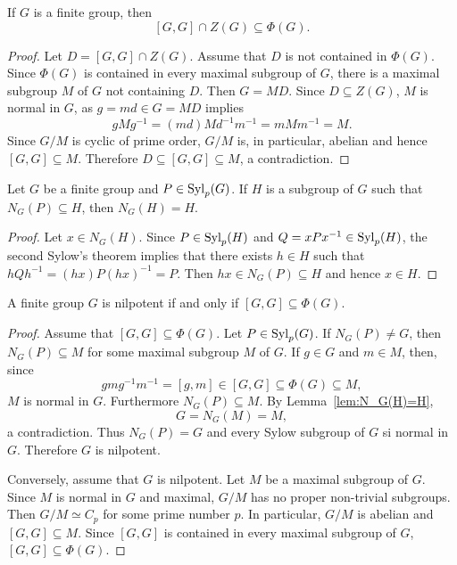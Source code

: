 \begin{theorem}
	\label{thm:Gaschutz}
	If $G$ is a finite group, then 
	\[
	[G,G]\cap Z(G)\subseteq\Phi(G).
	\]
\end{theorem}

\begin{proof}
Let $D=[G,G]\cap Z(G)$. Assume that $D$ is not contained in $\Phi(G)$.
Since $\Phi(G)$ is contained in every maximal subgroup of $G$, 
there is a maximal subgroup $M$ of $G$ not containing $D$. Then
$G=MD$. Since $D\subseteq Z(G)$, $M$ is normal in $G$, as 
	$g=md\in G=MD$ implies 
	\[
		gMg^{-1}=(md)Md^{-1}m^{-1}=mMm^{-1}=M.
	\]
	Since $G/M$ is cyclic of prime order, 
	$G/M$ is, in particular, abelian and hence $[G,G]\subseteq M$. Therefore 
	$D\subseteq [G,G]\subseteq M$, a contradiction.
\end{proof}

\begin{lemma}
\label{lem:N_G(H)=H}
Let $G$ be a finite group and $P\in\mathrm{Syl}_p(G)$. If $H$ is a subgroup of $G$ such that
$N_G(P)\subseteq H$, then $N_G(H)=H$.
\end{lemma}

\begin{proof}
Let $x\in N_G(H)$. Since $P\in\mathrm{Syl}_p(H)$ and $Q=xPx^{-1}\in\mathrm{Syl}_p(H)$, the second Sylow's theorem 
implies that there exists 
$h\in H$ such that $hQh^{-1}=(hx)P(hx)^{-1}=P$. Then $hx\in
N_G(P)\subseteq H$ and hence $x\in H$. 
\end{proof}

\begin{theorem}[Wielandt]
\label{thm:Wielandt}
A finite group $G$ is nilpotent if and only if 
$[G,G]\subseteq\Phi(G)$.
\end{theorem}

\begin{proof}
Assume that $[G,G]\subseteq\Phi(G)$. Let $P\in\mathrm{Syl}_p(G)$. If $N_G(P)\ne
G$, then $N_G(P)\subseteq M$ for some maximal subgroup $M$ of $G$. If 
$g\in G$ and $m\in M$, then, since 
\[
	gmg^{-1}m^{-1}=[g,m]\in [G,G]\subseteq\Phi(G)\subseteq M,
\]
$M$ is normal in $G$. Furthermore $N_G(P)\subseteq M$. 
By Lemma~\ref{lem:N_G(H)=H},
\[
G=N_G(M)=M,
\]
a contradiction.
Thus $N_G(P)=G$ and every Sylow subgroup of $G$ si normal in $G$. Therefore 
$G$ is nilpotent. 

Conversely, assume that $G$ is nilpotent. Let $M$ be a maximal subgroup of $G$.
Since $M$ is normal in $G$ and maximal, $G/M$ has no proper non-trivial subgroups. 
Then $G/M\simeq C_p$ for some prime number $p$. In particular, $G/M$ is abelian
and $[G,G]\subseteq M$. Since $[G,G]$ is contained in every maximal subgroup of $G$, 
$[G,G]\subseteq\Phi(G)$.
\end{proof}

